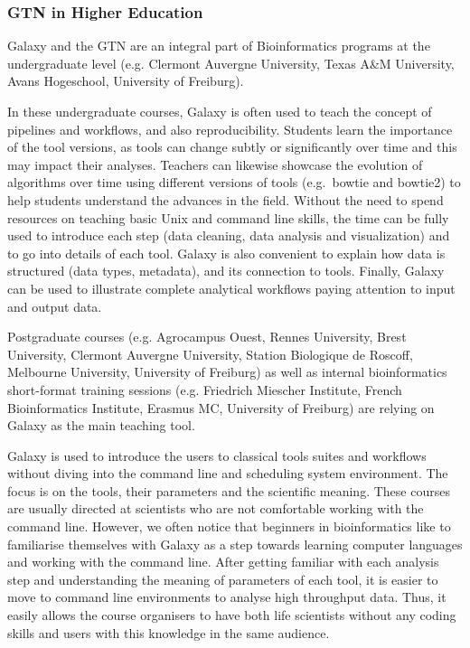 \documentclass[10pt,letterpaper]{article}
\begin{document}
\subsubsection*{GTN in Higher Education}

Galaxy and the GTN are an integral part of Bioinformatics programs at the undergraduate level (e.g. Clermont Auvergne University, Texas A\&M University, Avans Hogeschool, University of Freiburg). 

In these undergraduate courses, Galaxy is often used to teach the concept of pipelines and workflows, and also reproducibility. Students learn the importance of the tool versions, as tools can change subtly or significantly over time and this may impact their analyses. Teachers can likewise showcase the evolution of algorithms over time using different versions of tools (e.g.\ bowtie and bowtie2) to help students understand the advances in the field. 
Without the need to spend resources on teaching basic Unix and command line skills, the time can be fully used to introduce each step (data cleaning, data analysis and visualization) and to go into details of each tool. Galaxy is also convenient to explain how data is structured (data types, metadata), and its connection to tools. Finally, Galaxy can be used to illustrate complete analytical workflows paying attention to input and output data.

Postgraduate courses (e.g. Agrocampus Ouest, Rennes University, Brest University, Clermont Auvergne University, Station Biologique de Roscoff, Melbourne University, University of Freiburg) as well as internal bioinformatics short-format training sessions (e.g. Friedrich Miescher Institute, French Bioinformatics Institute, Erasmus MC, University of Freiburg) are relying on Galaxy as the main teaching tool.

Galaxy is used to introduce the users to classical tools suites and workflows without diving into the command line and scheduling system environment. The focus is on the tools, their parameters and the scientific meaning. These courses are usually directed at scientists who are not comfortable working with the command line. However, we often notice that beginners in bioinformatics like to familiarise themselves with Galaxy as a step towards learning computer languages and working with the command line. After getting familiar with each analysis step and understanding the meaning of parameters of each tool, it is easier to move to command line environments to analyse high throughput data. Thus, it easily allows the course organisers to have both life scientists without any coding skills and users with this knowledge in the same audience.
\end{document}
